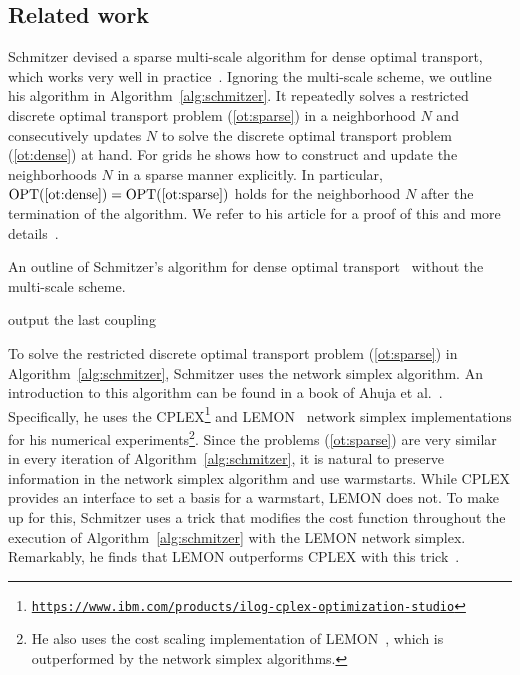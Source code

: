 \documentclass[a4paper,UKenglish,cleveref, autoref, thm-restate]{lipics-v2021}
\DeclareMathOperator{\OPT}{OPT}
\begin{document}
\subsection{Related work}
Schmitzer devised a sparse multi-scale algorithm for dense optimal transport, which works very well in practice~\cite{schmitzer2016sparse,schrieber2017dotmark}.
Ignoring the multi-scale scheme, we outline his algorithm in Algorithm~\ref{alg:schmitzer}.
It repeatedly solves a restricted discrete optimal transport problem (\ref{ot:sparse}) in a neighborhood $N$ and consecutively updates $N$ to solve the discrete optimal transport problem (\ref{ot:dense}) at hand.
For grids he shows how to construct and update the neighborhoods $N$ in a sparse manner explicitly.
In particular, $\OPT(\text{\ref{ot:dense}}) = \OPT(\text{\ref{ot:sparse}})$ holds for the neighborhood $N$ after the termination of the algorithm.
We refer to his article for a proof of this and more details~\cite{schmitzer2016sparse}.
\begin{algorithm}[h]
\caption{An outline of Schmitzer's algorithm for dense optimal transport~\cite{schmitzer2016sparse} without the multi-scale scheme.}\label{alg:schmitzer}
\DontPrintSemicolon
{}
output the last coupling\;
\end{algorithm}

To solve the restricted discrete optimal transport problem (\ref{ot:sparse}) in Algorithm~\ref{alg:schmitzer}, Schmitzer uses the network simplex algorithm.
An introduction to this algorithm can be found in a book of Ahuja et al.~\cite{ahuja1993networkflows}.
Specifically, he uses the CPLEX\footnote{\href{https://www.ibm.com/products/ilog-cplex-optimization-studio}{\tt https://www.ibm.com/products/ilog-cplex-optimization-studio}} and LEMON~\cite{dezso2010lemon} network simplex implementations for his numerical experiments\footnote{He also uses the cost scaling implementation of LEMON~\cite{dezso2010lemon}, which is outperformed by the network simplex algorithms.}.
Since the problems (\ref{ot:sparse}) are very similar in every iteration of Algorithm~\ref{alg:schmitzer}, it is natural to preserve information in the network simplex algorithm and use warmstarts.
While CPLEX provides an interface to set a basis for a warmstart, LEMON does not.
To make up for this, Schmitzer uses a trick that modifies the cost function throughout the execution of Algorithm~\ref{alg:schmitzer} with the LEMON network simplex.
Remarkably, he finds that LEMON outperforms CPLEX with this trick~\cite{schmitzer2016sparse}.
\end{document}
